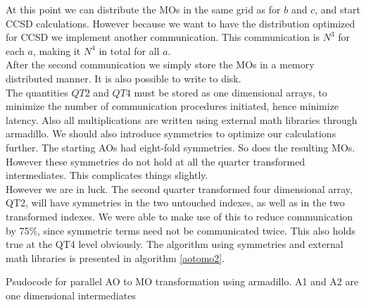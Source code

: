 \documentclass[a4paper,norsk,11pt,twoside]{report}
\begin{document}
At this point we can distribute the MOs in the same grid as for $b$
and $c$, and start CCSD calculations. However because we want to have
the distribution optimized for CCSD we implement another
communication. This communication is $N^3$ for each $a$, making it
$N^4$ in total for all $a$. \\

After the second communication we simply store the MOs in a memory
distributed manner. It is also possible to write to disk. \\

The quantities $QT2$ and $QT4$ must be stored as one dimensional
arrays, to minimize the number of communication procedures initiated,
hence minimize latency. Also all multiplications are written using
external math libraries through armadillo. We should also introduce
symmetries to optimize our calculations further. The starting AOs had
eight-fold symmetries. So does the resulting MOs. However these
symmetries do not hold at all the quarter transformed
intermediates. This complicates things slightly. \\

However we are in luck. The second quarter transformed four
dimensional array, QT2, will have symmetries in the two untouched
indexes, as well as in the two transformed indexes. We were able to
make use of this to reduce communication by 75\%, since symmetric
terms need not be communicated twice. This also holds true at the QT4
level obviously. The algorithm using symmetries and external math
libraries is presented in algorithm \ref{aotomo2}. \\

\begin{algorithm}
  
 \caption{Psudocode for parallel AO to MO transformation using armadillo. A1 and A2 are one dimensional intermediates}
 \label{aotomo2}
\end{algorithm}
\end{document}
